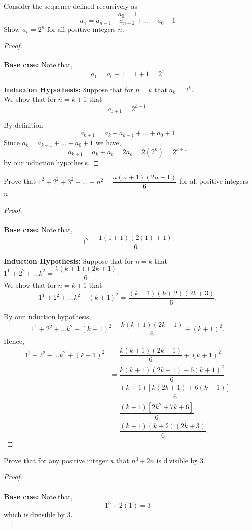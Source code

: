 \documentclass[11pt]{exam}
\theoremstyle{definition}
\begin{document}
\begin{questions}
\question Consider the sequence defined recursively as 
\[a_0=1\]
\[a_n=a_{n-1}+a_{n-2}+\ldots +a_0+1\]
Show $a_n=2^n$ for all positive integers $n$. 
\begin{proof}
\ \\
\ \\
{\bf Base case: }
Note that, 
\[a_1=a_0+1=1+1=2^1\]

{\bf Induction Hypothesis: }
Suppose that for $n=k$ that $a_k=2^{k}$.\\

We show that for $n=k+1$ that 
\[a_{k+1}=2^{k+1}.\]

By definition 
\[a_{k+1}=a_k+a_{k-1}+\ldots +a_0+1\] 
Since $a_k=a_{k-1}+\ldots +a_0+1$ we have, 
\[a_{k+1}=a_k+a_k=2a_k=2(2^k)=2^{k+1}\]
by our induction hypothesis. 



\end{proof}
\newpage
\question 
Prove that $1^2+2^2+3^2+\ldots +n^2=\dfrac{n(n+1)(2n+1)}{6}$ for all positive integers $n$. 
\begin{proof}
\ \\
\ \\
{\bf Base case: }
Note that, 
\[1^2=\dfrac{1(1+1)(2(1)+1)}{6}\]

{\bf Induction Hypothesis: }
Suppose that for $n=k$ that $1^1+2^2+\ldots k^2=\dfrac{k(k+1)(2k+1)}{6}$.\\

We show that for $n=k+1$ that 
\[1^1+2^2+\ldots k^2+(k+1)^2=\dfrac{(k+1)(k+2)(2k+3)}{6}.\]

By our induction hypothesis,
\[1^1+2^2+\ldots k^2+(k+1)^2=\dfrac{k(k+1)(2k+1)}{6}+(k+1)^2.\]
Hence, 
\begin{align*}
1^1+2^2+\ldots k^2+(k+1)^2&=\dfrac{k(k+1)(2k+1)}{6}+(k+1)^2.\\
&=\dfrac{k(k+1)(2k+1)+6(k+1)^2}{6}\\
&=\dfrac{(k+1)[k(2k+1)+6(k+1)]}{6}\\
&=\dfrac{(k+1)[2k^2+7k+6]}{6}\\
&=\dfrac{(k+1)(k+2)(2k+3)}{6}.
\end{align*} 



\end{proof}
\newpage
\question Prove that for any positive integer $n$ that $n^3+2n$ is divisible by 3. 

\begin{proof}
\ \\
\ \\
{\bf Base case: }
Note that, 
\[1^3+2(1)=3\] 
which is divisible by 3. \\


\end{proof}
\end{questions}
\end{document}

